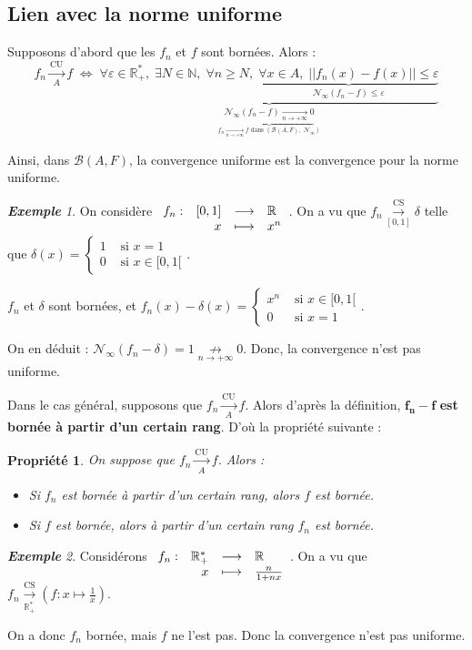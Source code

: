 \documentclass[12pt]{book}
\let\ensembleNombre\mathbb
\newcommand*\N{\ensuremath{\ensembleNombre{N}}}
\newcommand*\R{\ensuremath{\ensembleNombre{R}}}
\newcommand*\B{\ensuremath{\mathcal B}}
\newcommand{\app}[5]{\ensuremath{
\begin{array}[t]{lrcl}
#1 : & #2 & \longrightarrow & #3 \\
    & #4 & \longmapsto & #5 \end{array}
}}
\newcommand{\limite}[2]{\ensuremath{\underset{#1 \to #2}{\longrightarrow}}}
\newcommand{\notlimite}[2]{\ensuremath{\underset{#1 \to #2}{\not\longrightarrow}}}
\newcommand{\ls}[1]{\ensuremath{\overset{\mathrm{CS}}{\underset{#1}{\longrightarrow}}}}
\newcommand{\lu}[1]{\ensuremath{\overset{\mathrm{CU}}{\underset{#1}{\longrightarrow}}}}
\newtheorem*{prop}{Propriété}
\theoremstyle{definition}
\theoremstyle{remark}
\newtheorem*{ex}{\textbf{Exemple}}
\begin{document}
		\subsection{Lien avec la norme uniforme}
	Supposons d'abord que les $f_n$ et $f$ sont bornées. Alors :
	\[ f_n \lu{A} f \;\Longleftrightarrow\; \underbrace{ \forall \varepsilon \in \R_+^*,\; \exists N \in \N, \; \forall n \geq N,\; \underbrace{\forall x \in A, \; ||f_n(x) - f(x) || \leq \varepsilon}_{\mathcal N_\infty (f_n - f) \leq \varepsilon}}_{\underbrace{\mathcal N_\infty(f_n-f) \limite{n}{+\infty} 0}_{f_n \limite{n}{+\infty} f \text{ dans } (\B(A,F), \;\mathcal N_\infty)}}\]
	
	Ainsi, dans $\B(A,F)$, la convergence uniforme est la convergence pour la norme uniforme.
	
	\begin{ex}
	On considère $\app{f_n}{[0,1]}{\R}{x}{x^n}$. On a vu que $f_n \ls{[0,1]} \delta$ telle que $													\delta(x) = \begin{cases}
														 1 &\text{ si } x = 1\\
														 0 &\text{ si } x \in [0,1[
														 \end{cases}$.
														 
	$f_n$ et $\delta$ sont bornées, et $f_n(x) - \delta(x) = \begin{cases}
															 x^n &\text{ si } x \in [0,1[\\
															 0 &\text{ si } x = 1
															 \end{cases}$.
															 
	On en déduit : $\mathcal N_\infty(f_n - \delta) = 1 \notlimite{n}{+\infty} 0$. Donc, la convergence n'est pas uniforme.
	\end{ex}
	
	Dans le cas général, supposons que $f_n \lu {A} f$. Alors d'après la définition, $\bm{f_n - f}$ \textbf{est bornée à partir d'un certain rang}. D'où la propriété suivante :
	\begin{prop}
	On suppose que $f_n \lu {A} f$. Alors :
	\begin{itemize}
	\item Si $f_n$ est bornée à partir d'un certain rang, alors $f$ est bornée.
	\item Si $f$ est bornée, alors à partir d'un certain rang $f_n$ est bornée.
	\end{itemize}
	\end{prop}
	
	\begin{ex}
	Considérons $\app{f_n}{\R_+^*}{\R}{x}{\frac{n}{1+nx}}$. On a vu que $f_n \ls{\R_+^*} \left( f : x \longmapsto \frac{1}{x} \right)$.
	
	On a donc $f_n$ bornée, mais $f$ ne l'est pas. Donc la convergence n'est pas uniforme.
	\end{ex}
	
\end{document}
